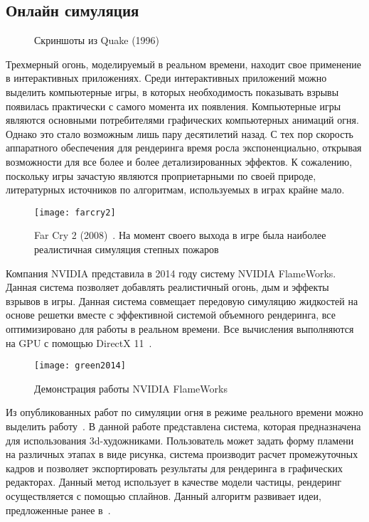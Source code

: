 \subsection{Онлайн симуляция}
\begin{figure}%
    \centering
    \qquad
    \caption{Скриншоты из Quake (1996)~\cite{capstone}}%
    \label{fig:example}%
\end{figure}
Трехмерный огонь, моделируемый в реальном времени, находит свое применение в
интерактивных приложениях. Среди интерактивных приложений можно выделить
компьютерные игры, в которых необходимость показывать взрывы появилась
практически с самого момента их появления. Компьютерные игры являются основными
потребителями графических компьютерных анимаций огня. Однако это стало возможным
лишь пару десятилетий назад. С тех пор скорость аппаратного обеспечения для
рендеринга время росла экспоненциально, открывая возможности для все более и
более детализированных эффектов. К сожалению, поскольку игры зачастую являются
проприетарными по своей природе, литературных источников по алгоритмам,
используемых в играх крайне мало.
\begin{figure}[htb]
	\centering
	\texttt{[image: farcry2]}
	\caption{Far Cry 2 (2008)~\cite{farcry2}. На момент своего выхода в игре
	была наиболее реалистичная симуляция степных пожаров}
\end{figure}
Компания NVIDIA представила в 2014 году систему NVIDIA FlameWorks. Данная
система позволяет добавлять реалистичный огонь, дым и эффекты взрывов в игры.
Данная система совмещает передовую симуляцию жидкостей на основе решетки вместе
с эффективной системой объемного рендеринга, все оптимизировано для работы в
реальном времени. Все вычисления выполняются на GPU с помощью DirectX
11~\cite{Green:2014:NFR:2633956.2658828}.
\begin{figure}[htb]
	\centering
	\texttt{[image: green2014]}
	\caption{Демонстрация работы NVIDIA FlameWorks}
\end{figure}

Из опубликованных работ по симуляции огня в режиме реального времени можно
выделить работу~\cite{turbulence}. В данной работе представлена система, которая
предназначена для использования 3d-художниками. Пользователь может задать форму
пламени на различных этапах в виде рисунка, система производит расчет
промежуточных кадров и позволяет экспортировать результаты для рендеринга в
графических редакторах. Данный метод использует в качестве модели частицы,
рендеринг осуществляется с помощью сплайнов. Данный алгоритм развивает идеи,
предложенные ранее в~\cite{Vanzine2007RealisticRR}.

